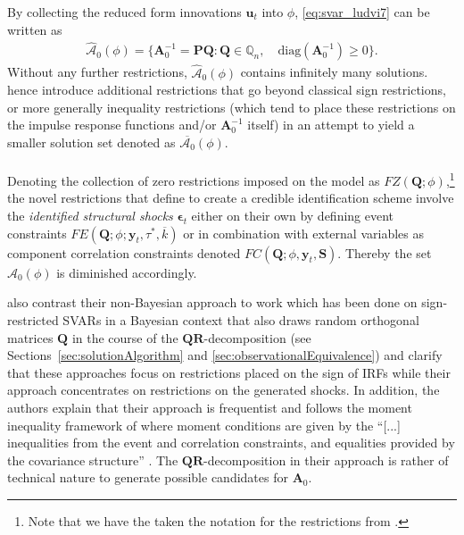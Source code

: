 \documentclass[a4paper,11pt,listof=nochaptergap,oneside,pointednumbers,bibtotoc,bigheadings,liststotoc,hidelinks]{scrbook}
\theoremstyle{mysatz}
\theoremstyle{mydefinition}
\theoremstyle{mytheorem}
\theoremstyle{mybemerkung}
\let\oldhat\hat
\newcommand{\vect}[1]{\boldsymbol{\mathbf{#1}}}
\newcommand{\hatt}[1]{\oldhat{\boldsymbol{\mathbf{#1}}}}
\begin{document}
By collecting the reduced form innovations $\vect{u}_t$ into $\phi$, \ref{eq:svar_ludvi7} can be written as 
\begin{equation} \label{eq:svar_ludvi8}
\begin{split}
 			\hatt{\mathcal{A}}_0(\phi) = \{\vect{A}_0^{-1} = \vect{P}\vect{Q}: \vect{Q} \in \mathbb{Q}_n, \quad \text{diag}(\vect{A}_0^{-1}) \geq 0\}.
\end{split}								
\end{equation}
Without any further restrictions, $\hatt{\mathcal{A}}_0(\phi)$ contains infinitely many solutions. \citet{ludvigsonetal:19} hence introduce additional restrictions that go beyond classical sign restrictions, or more generally inequality restrictions (which tend to place these restrictions on the impulse response functions and/or $\vect{A}_0^{-1}$ itself) in an attempt to yield a smaller solution set denoted as $\overline{\mathcal{A}_0}(\phi)$.\\
\\
Denoting the collection of zero restrictions imposed on the model as $FZ(\vect{Q}; \phi)$,\footnote{Note that we have the taken the notation for the restrictions from \citet{ludvigsonetal:17}.} the novel restrictions that \citet{ludvigsonetal:19} define to create a credible identification scheme involve the \textit{identified structural shocks} $\vect{\epsilon}_t$ either on their own by defining event constraints $FE(\vect{Q}; \phi; \vect{y}_t, \tau^*, \overline{k})$ or in combination with external variables as component correlation constraints denoted $FC(\vect{Q}; \phi, \vect{y}_t, \vect{S})$. Thereby the set $\hatt{\mathcal{A}}_0(\phi)$ is diminished accordingly.

\citet{ludvigsonetal:18,ludvigsonetal:19} also contrast their non-Bayesian approach to work which has been done on sign-restricted SVARs in a Bayesian context that also draws random orthogonal matrices $\vect{Q}$ in the course of the $\vect{QR}$-decomposition (see Sections~\ref{sec:solutionAlgorithm} and \ref{sec:observationalEquivalence}) and clarify that these approaches focus on restrictions placed on the sign of IRFs while their approach concentrates on restrictions on the generated shocks. In addition, the authors explain that their approach is frequentist and follows the moment inequality framework of \citet{andrewsandsoares:10} where moment conditions are given by the ``[...] inequalities from the event and correlation constraints, and equalities provided by the covariance structure'' \citet[p. 14]{ludvigsonetal:19}. The $\vect{QR}$-decomposition in their approach is rather of technical nature to generate possible candidates for $\vect{A}_0$.
\end{document}
